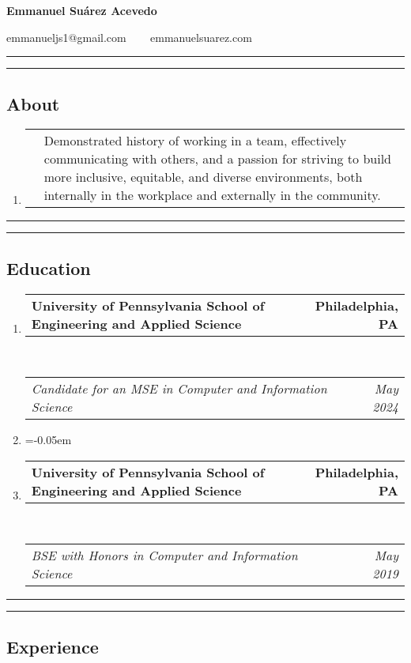 \documentclass[letterpaper]{article}
\makeatletter
\newcommand*{\tabulardef}[3]{\begin{tabular}[t]{@{}lp{\dimexpr\linewidth-#1}@{}}
    #2&#3
\end{tabular}}
\newcommand{\headerrow}[2]
{\begin{tabular*}{\linewidth}{l@{\extracolsep{\fill}}r}
	#1 &
	#2 \\
\end{tabular*}}
\makeatother
\begin{document}
\begin{center}
{\LARGE \textbf{Emmanuel Suárez Acevedo}}

emmanueljs1@gmail.com \ \textbullet
\ \ emmanuelsuarez.com \\
\end{center}

\hrule
\hrule
\vspace{-0.6em}
\subsection*{About}
\begin{enumerate}[label=]
    \item\tabulardef{1cm}{}{Demonstrated history of working in a team,
          effectively communicating with others, and a passion
          for striving to build more inclusive, equitable, and
          diverse environments, both internally in the workplace and
          externally in the community.}
\end{enumerate}

\hrule
\hrule
\vspace{-0.6em}
\subsection*{Education}

\begin{enumerate}[label=]
	\parskip=-0.05em
	\item 
	\headerrow
		{\textbf{University of Pennsylvania School of Engineering and Applied Science}}
		{\textbf{Philadelphia, PA}}
	\\
	\headerrow
		{\emph{Candidate for an MSE in Computer and Information Science}}
		{\emph{May 2024}}

    \item

	\parskip=-0.05em
	\item 
	\headerrow
		{\textbf{University of Pennsylvania School of Engineering and Applied Science}}
		{\textbf{Philadelphia, PA}}
	\\
	\headerrow
		{\emph{BSE with Honors in Computer and Information Science}}
		{\emph{May 2019}}

\end{enumerate}

\hrule\hrule
\vspace{-0.6em}
\subsection*{Experience}
\end{document}
